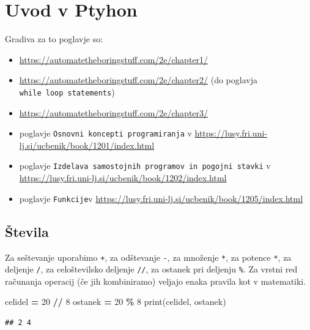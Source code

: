 \documentclass[
]{book}
\newenvironment{Shaded}{\begin{snugshade}}{\end{snugshade}}
\newcommand{\BuiltInTok}[1]{#1}
\newcommand{\DecValTok}[1]{\textcolor[rgb]{0.00,0.00,0.81}{#1}}
\newcommand{\NormalTok}[1]{#1}
\newcommand{\OperatorTok}[1]{\textcolor[rgb]{0.81,0.36,0.00}{\textbf{#1}}}
\providecommand{\tightlist}{%
  \setlength{\itemsep}{0pt}\setlength{\parskip}{0pt}}
\begin{document}
\hypertarget{uvod-v-ptyhon}{%
\chapter{Uvod v Ptyhon}\label{uvod-v-ptyhon}}

Gradiva za to poglavje so:

\begin{itemize}
\tightlist
\item
  \url{https://automatetheboringstuff.com/2e/chapter1/}
\item
  \url{https://automatetheboringstuff.com/2e/chapter2/} (do poglavja \texttt{while\ loop\ statements})
\item
  \url{https://automatetheboringstuff.com/2e/chapter3/}
\item
  poglavje \texttt{Osnovni\ koncepti\ programiranja} v \url{https://lusy.fri.uni-lj.si/ucbenik/book/1201/index.html}
\item
  poglavje \texttt{Izdelava\ samostojnih\ programov\ in\ pogojni\ stavki} v \url{https://lusy.fri.uni-lj.si/ucbenik/book/1202/index.html}
\item
  poglavje \texttt{Funkcije}v \url{https://lusy.fri.uni-lj.si/ucbenik/book/1205/index.html}
\end{itemize}

\hypertarget{ux161tevila}{%
\section{Števila}\label{ux161tevila}}

Za seštevanje uporabimo \texttt{+}, za odštevanje \texttt{-}, za množenje \texttt{*}, za potence \texttt{*},
za deljenje \texttt{/}, za celoštevilsko deljenje \texttt{//}, za ostanek pri deljenju \texttt{\%}.
Za vrstni red računanja operacij (če jih kombiniramo) veljajo enaka pravila kot
v matematiki.

\begin{Shaded}
\begin{Highlighting}[]
\NormalTok{celidel }\OperatorTok{=} \DecValTok{20} \OperatorTok{//} \DecValTok{8}
\NormalTok{ostanek }\OperatorTok{=} \DecValTok{20} \OperatorTok{\%} \DecValTok{8}
\BuiltInTok{print}\NormalTok{(celidel, ostanek)}
\end{Highlighting}
\end{Shaded}

\begin{verbatim}
## 2 4
\end{verbatim}
\end{document}
